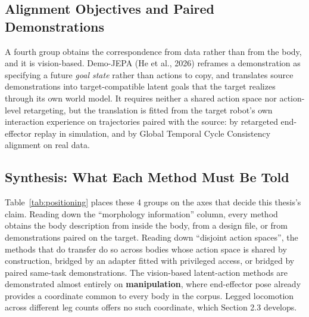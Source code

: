 \documentclass[12pt,a4paper,oneside]{report}
\begin{document}
\subsection{Alignment Objectives and Paired Demonstrations}
A fourth group obtains the correspondence from data rather than from the body, and it is vision-based.
Demo-JEPA (He et al., 2026) reframes a demonstration as specifying
a future \emph{goal state} rather than actions to copy, and translates source demonstrations into
target-compatible latent goals that the target realizes through its own world model. It requires
neither a shared action space nor action-level retargeting, but the translation is fitted from the
target robot's own interaction experience on trajectories paired with the source: by retargeted
end-effector replay in simulation, and by Global Temporal Cycle Consistency alignment on real data.


\subsection{Synthesis: What Each Method Must Be Told}
Table~\ref{tab:positioning} places these 4 groups on the axes that decide this thesis's claim.
Reading down the ``morphology information'' column, every method obtains the body description from
inside the body, from a design file, or from demonstrations paired on the target. Reading down
``disjoint action spaces'', the methods that do transfer do so across bodies whose action space is
shared by construction, bridged by an adapter fitted with privileged access, or bridged by paired
same-task demonstrations. The vision-based latent-action methods are
demonstrated almost entirely on \textbf{manipulation}, where end-effector pose already provides a
coordinate common to every body in the corpus. Legged locomotion across different leg counts offers
no such coordinate, which Section 2.3 develops.
\end{document}

